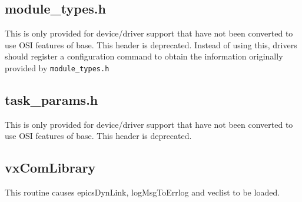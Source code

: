 \subsection{module\_types.h}

This is only provided for device/driver support that have not been converted to use OSI features of base.
This header is deprecated.
Instead of using this, drivers should register a configuration command to obtain
the information originally provided by \verb|module_types.h|

\subsection{task\_params.h}

This is only provided for device/driver support that have not been converted to use OSI features of base.
This header is deprecated.

\subsection{vxComLibrary}

This routine causes epicsDynLink, logMsgToErrlog and veclist to be loaded.

